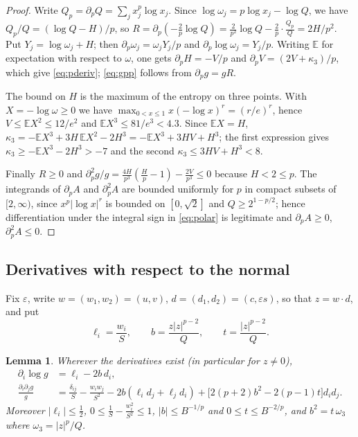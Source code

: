 \documentclass[11pt]{amsart}
\newtheorem{lemma}[theorem]{Lemma}
\theoremstyle{definition}
\theoremstyle{remark}
\numberwithin{equation}{section}
\newcommand{\ve}{\varepsilon}
\begin{document}
\begin{proof}
Write $Q_p=\partial_pQ=\sum_jx_j^p\log x_j$. Since $\log\omega_j=p\log x_j-\log Q$, we have $Q_p/Q=(\log Q-H)/p$, so $R=\partial_p(-\tfrac2p\log Q)=\tfrac{2}{p^2}\log Q-\tfrac2p\cdot\tfrac{Q_p}{Q}=2H/p^2$. Put $Y_j=\log\omega_j+H$; then $\partial_p\omega_j=\omega_jY_j/p$ and $\partial_p\log\omega_j=Y_j/p$. Writing $\mathbb E$ for expectation with respect to $\omega$, one gets $\partial_pH=-V/p$ and $\partial_pV=(2V+\kappa_3)/p$, which give \eqref{eq:pderiv}; \eqref{eq:gpp} follows from $\partial_p g=gR$.

The bound on $H$ is the maximum of the entropy on three points. With $X=-\log\omega\ge0$ we have $\max_{0<x\le1}x(-\log x)^r=(r/e)^r$, hence $V\le\mathbb EX^2\le 12/e^2$ and $\mathbb EX^3\le 81/e^3<4.3$. Since $\mathbb EX=H$, $\kappa_3=-\mathbb EX^3+3H\,\mathbb EX^2-2H^3=-\mathbb EX^3+3HV+H^3$; the first expression gives $\kappa_3\ge -\mathbb EX^3-2H^3>-7$ and the second $\kappa_3\le 3HV+H^3<8$.

Finally $R\ge0$ and $\partial_p^2g/g=\tfrac{4H}{p^3}(\tfrac Hp-1)-\tfrac{2V}{p^3}\le0$ because $H<2\le p$. The integrands of $\partial_pA$ and $\partial_p^2A$ are bounded uniformly for $p$ in compact subsets of $[2,\infty)$, since $x^p|\log x|^r$ is bounded on $[0,\sqrt2]$ and $Q\ge 2^{1-p/2}$; hence differentiation under the integral sign in \eqref{eq:polar} is legitimate and $\partial_pA\ge0$, $\partial_p^2A\le0$.
\end{proof}

\subsection{Derivatives with respect to the normal}

Fix $\ve$, write $w=(w_1,w_2)=(u,v)$, $d=(d_1,d_2)=(c,\ve s)$, so that $z=w\cdot d$, and put
\[
\ell_i=\frac{w_i}{S},\qquad b=\frac{z|z|^{p-2}}{Q},\qquad t=\frac{|z|^{p-2}}{Q}.
\]

\begin{lemma}\label{lem:normal}
Wherever the derivatives exist (in particular for $z\ne0$),
\begin{align}
\partial_i\log g&=\ell_i-2b\,d_i,\label{eq:L1}\\
\frac{\partial_i\partial_jg}{g}&=\frac{\delta_{ij}}{S}-\frac{w_iw_j}{S^2}-2b(\ell_id_j+\ell_jd_i)+\bigl[2(p+2)b^2-2(p-1)t\bigr]d_id_j .\label{eq:Mij}
\end{align}
Moreover $|\ell_i|\le\frac12$, $0\le\frac1S-\frac{w_i^2}{S^2}\le1$, $|b|\le B^{-1/p}$ and $0\le t\le B^{-2/p}$, and $b^2=t\,\omega_3$ where $\omega_3=|z|^p/Q$.
\end{lemma}
\end{document}
